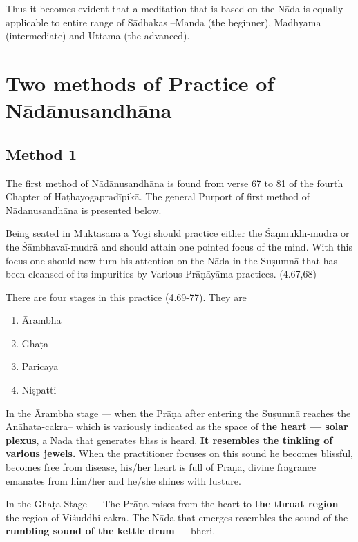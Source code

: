 Thus it becomes evident that a meditation that is based on the Nāda is equally applicable to entire range of Sādhakas –Manda (the beginner), Madhyama (intermediate) and Uttama (the advanced).

\section*{Two methods of Practice of Nādānusandhāna}

\subsection*{Method 1}

The first method of Nādānusandhāna is found from verse 67 to 81 of the fourth Chapter of Haṭhayogapradīpikā. The general Purport of first method of Nādanusandhāna is presented below.

Being seated in Muktāsana a Yogi should practice either the Śaṇmukhī-mudrā or the Śāmbhavaī-mudrā and should attain one pointed focus of the mind. With this focus one should now turn his attention on the Nāda in the Suṣumnā that has been cleansed of its impurities by Various Prāṇāyāma practices. (4.67,68)

There are four stages in this practice (4.69-77). They are

\begin{enumerate}
\itemsep=0pt
\renewcommand{\theenumi}{\alph{enumi}}
\renewcommand{\labelenumi}{\theenumi.}
\item Ārambha 
\item Ghaṭa
\item Paricaya
\item Niṣpatti 
\end{enumerate}

In the Ārambha stage --- when the Prāṇa after entering the Suṣumnā reaches the Anāhata-cakra– which is variously indicated as the space of \textbf{the heart --- solar plexus}, a Nāda that generates bliss is heard. \textbf{It resembles the tinkling of various jewels.} When the practitioner focuses on this sound he becomes blissful, becomes free from disease, his/her heart is full of Prāṇa, divine fragrance emanates from him/her and he/she shines with lusture. 

In the Ghaṭa Stage --- The Prāṇa raises from the heart to \textbf{the throat region} --- the region of Viśuddhi-cakra. The Nāda that emerges resembles the sound of the \textbf{rumbling sound of the kettle drum} --- bheri.

